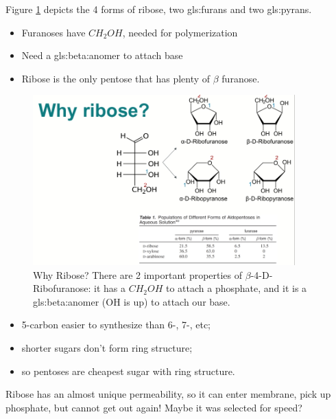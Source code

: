 \documentclass[]{article}
\begin{document}
Figure \ref{fig:WhyRibose} depicts the 4 forms of ribose\cite{wei2009permeation}, two \glspl{gls:furan} and two \glspl{gls:pyran}.
\begin{itemize}
	\item Furanoses have $CH_2OH$, needed for polymerization
	\item Need a \gls{gls:beta:anomer} to attach base
	\item Ribose is the only pentose that has plenty of $\beta$ furanose. 
\end{itemize}
\begin{figure}[H]
	\caption[Why Ribose?]{Why Ribose? There are 2 important properties of $\beta$-4-D-Ribofuranose: it has a $CH_2OH$ to attach a phosphate, and it is a \gls{gls:beta:anomer} (OH is up) to attach our base.\label{fig:WhyRibose} }
	\includegraphics[width=0.9\textwidth]{WhyRibose}
\end{figure}

\begin{itemize}
	\item 5-carbon easier to synthesize than 6-, 7-, etc;
	\item shorter sugars don't form ring structure;
	\item so pentoses are cheapest sugar with ring structure.
\end{itemize}

Ribose has an almost unique permeability, so it can enter membrane, pick up phosphate, but cannot get out again! Maybe it was selected for speed?
\end{document}
